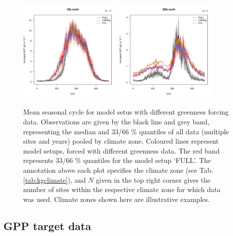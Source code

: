 \documentclass{myreport}
\begin{document}
 \begin{figure}[!ht]
    \centering
\includegraphics[width=0.45\textwidth]{fig/meandoy_byzone_Dfb_north_greenness.pdf}
\includegraphics[width=0.45\textwidth]{fig/meandoy_byzone_BSk_north_greenness.pdf}\\
    \caption{Mean seasonal cycle for model setus with different greenness forcing data. Observations are given by the black line and grey band, representing the median and 33/66 \% quantiles of all data (multiple sites and years) pooled by climate zone. Coloured lines represent model setups, forced with different greenness data. The red band represents 33/66 \% quantiles for the model setup `FULL'. The annotation above each plot specifies the climate zone (see Tab. \ref{tab:kgclimate}), and $N$ given in the top right corner gives the number of sites within the respective climate zone for which data was used. Climate zones shown here are illustrative examples.}
    \label{fig:season_greenness}
\end{figure}

\clearpage

\subsection{GPP target data}
\label{sec:results_gppdata}
\end{document}
